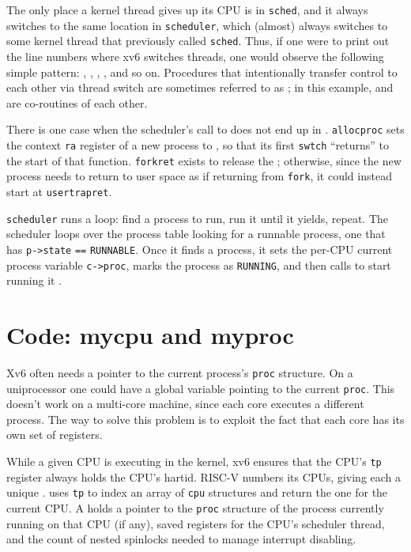 The only place a kernel thread gives up its CPU is in
\lstinline{sched},
and it always switches to the same location in \lstinline{scheduler}, which
(almost) always switches to some kernel thread that previously called
\lstinline{sched}. 
Thus, if one were to print out the line numbers where xv6 switches
threads, one would observe the following simple pattern:
,
,
,
,
and so on.
Procedures that intentionally transfer control to each other via thread
switch are sometimes referred to as
; 
in this example,
and
are co-routines of each other.

There is one case when the scheduler's call to
does not end up in
.
\lstinline{allocproc} sets the context \lstinline{ra}
register of a new process to
,
so that its first \lstinline{swtch} ``returns'' 
to the start of that function.
\lstinline{forkret}
exists to release the 
;
otherwise, since the new process needs to
return to user space as if returning from \lstinline{fork},
it could instead start at
\lstinline{usertrapret}.

\lstinline{scheduler}
runs a loop:
find a process to run, run it until it yields, repeat.
The scheduler
loops over the process table
looking for a runnable process, one that has
\lstinline{p->state} 
\lstinline{==}
\lstinline{RUNNABLE}.
Once it finds a process, it sets the per-CPU current process
variable
\lstinline{c->proc},
marks the process as
\lstinline{RUNNING},
and then calls
to start running it
.


\section{Code: mycpu and myproc}

Xv6 often needs a pointer to the current process's \lstinline{proc}
structure. On a uniprocessor one could have a global variable pointing
to the current \lstinline{proc}. This doesn't work on a multi-core
machine, since each core executes a different process. The way to
solve this problem is to exploit the fact that each core has its own
set of registers.

While a given CPU is executing in the kernel, xv6 ensures that the CPU's \lstinline{tp}
register always holds the CPU's hartid.
RISC-V numbers its CPUs, giving each
a unique .
uses \lstinline{tp} to index an array
of \lstinline{cpu} structures and return the one
for the current CPU.
A
holds a pointer to the \lstinline{proc}
structure of
the process currently running
on that CPU (if any),
saved registers for the CPU's scheduler thread,
and the count of nested spinlocks needed to manage
interrupt disabling.

